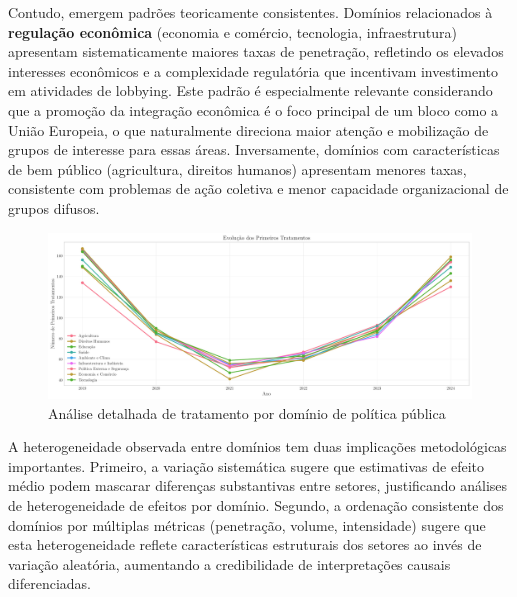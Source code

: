 Contudo, emergem padrões teoricamente consistentes. Domínios relacionados à \textbf{regulação econômica} (economia e comércio, tecnologia, infraestrutura) apresentam sistematicamente maiores taxas de penetração, refletindo os elevados interesses econômicos e a complexidade regulatória que incentivam investimento em atividades de lobbying. Este padrão é especialmente relevante considerando que a promoção da integração econômica é o foco principal de um bloco como a União Europeia, o que naturalmente direciona maior atenção e mobilização de grupos de interesse para essas áreas. Inversamente, domínios com características de bem público (agricultura, direitos humanos) apresentam menores taxas, consistente com problemas de ação coletiva e menor capacidade organizacional de grupos difusos.


\begin{figure}[htbp]
    \centering
    \includegraphics[width=\textwidth]{figures/fig7_domain_treatment_analysis.pdf}
    \caption{Análise detalhada de tratamento por domínio de política pública}
    \label{fig:domain_treatment}
\end{figure}


A heterogeneidade observada entre domínios tem duas implicações metodológicas importantes. Primeiro, a variação sistemática sugere que estimativas de efeito médio podem mascarar diferenças substantivas entre setores, justificando análises de heterogeneidade de efeitos por domínio. Segundo, a ordenação consistente dos domínios por múltiplas métricas (penetração, volume, intensidade) sugere que esta heterogeneidade reflete características estruturais dos setores ao invés de variação aleatória, aumentando a credibilidade de interpretações causais diferenciadas.

